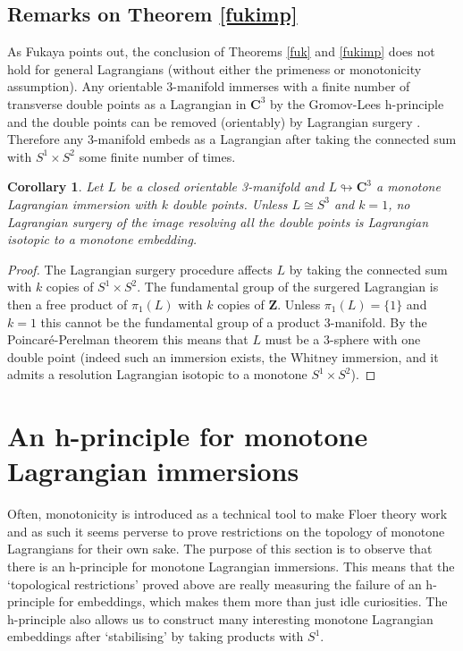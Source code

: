 \documentclass{amsart}
\newcommand{\CC}{\mathbf{C}}
\newcommand{\ZZ}{\mathbf{Z}}
\newtheorem{cormain}[thmmain]{Corollary}
\begin{document}
\subsection{Remarks on Theorem \ref{fukimp}}
As Fukaya points out, the conclusion of Theorems \ref{fuk} and \ref{fukimp} does not hold for general Lagrangians (without either the primeness or monotonicity assumption). Any orientable 3-manifold immerses with a finite number of transverse double points as a Lagrangian in $\CC^3$ by the Gromov-Lees h-principle \cite{Lees} and the double points can be removed (orientably) by Lagrangian surgery \cite{Pol}. Therefore any 3-manifold embeds as a Lagrangian after taking the connected sum with $S^1\times S^2$ some finite number of times.
\begin{cormain}
Let $L$ be a closed orientable 3-manifold and $L\looparrowright\CC^3$ a monotone Lagrangian immersion with $k$ double points. Unless $L\cong S^3$ and $k=1$, no Lagrangian surgery of the image resolving all the double points is Lagrangian isotopic to a monotone embedding.
\end{cormain}
\begin{proof}
The Lagrangian surgery procedure affects $L$ by taking the connected sum with $k$ copies of $S^1\times S^2$. The fundamental group of the surgered Lagrangian is then a free product of $\pi_1(L)$ with $k$ copies of $\ZZ$. Unless $\pi_1(L)=\{1\}$ and $k=1$ this cannot be the fundamental group of a product 3-manifold. By the Poincar\'{e}-Perelman theorem this means that $L$ must be a 3-sphere with one double point (indeed such an immersion exists, the Whitney immersion, and it admits a resolution Lagrangian isotopic to a monotone $S^1\times S^2$).
\end{proof}

\section{An h-principle for monotone Lagrangian immersions}\label{hprin}
Often, monotonicity is introduced as a technical tool to make Floer theory work and as such it seems perverse to prove restrictions on the topology of monotone Lagrangians for their own sake. The purpose of this section is to observe that there is an h-principle for monotone Lagrangian immersions. This means that the `topological restrictions' proved above are really measuring the failure of an h-principle for embeddings, which makes them more than just idle curiosities. The h-principle also allows us to construct many interesting monotone Lagrangian embeddings after `stabilising' by taking products with $S^1$.
\end{document}
